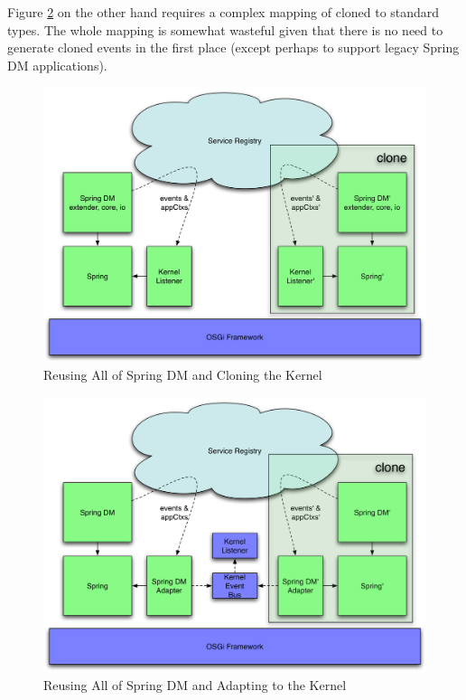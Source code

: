 \documentclass[a4paper,12pt]{article}
\begin{document}
Figure \ref{fig:cloningv1} on the other hand requires a complex mapping of cloned to standard
types. The whole mapping is somewhat wasteful given that there is no need to generate cloned
events in the first place (except perhaps to support legacy Spring DM applications).

\begin{figure}[h!]
\includegraphics*[scale=0.2]{cloning-v3.pdf}
\caption{Reusing All of Spring DM and Cloning the Kernel}
\label{fig:cloningv3}
\end{figure}

\begin{figure}[h!]
\includegraphics*[scale=0.2]{cloning-v1.pdf}
\caption{Reusing All of Spring DM and Adapting to the Kernel}
\label{fig:cloningv1}
\end{figure}
\end{document}
